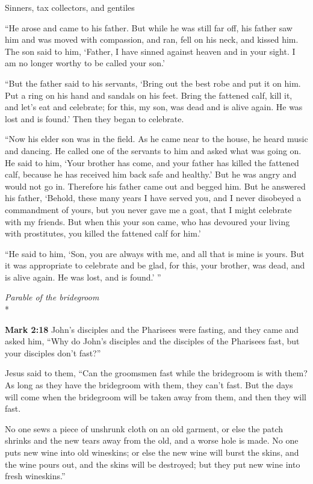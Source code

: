 \documentclass[10pt,twoside]{article} %
\newcommand{\quotesize}{\normalsize{}}
\newenvironment{quotetext}{\begingroup\quotesize}{\endgroup}
\newcommand{\intex}[1]{\index[texts]{#1}}
\newcommand{\bible}[2]{\begin{quotetext}\textbf{#1}\intex{#1} #2\end{quotetext}}
\newcommand{\gospelmark}[2]{\bible{Mark #1}{#2}}
\newcommand{\subhead}[1]{\emph{#1}\\*}
\begin{document}
\begin{section}{Sinners, tax collectors, and gentiles}
{   ``He arose and came to his father. But while he was still far off, his father saw him and was moved with compassion, and ran, fell on his neck, and kissed him.    The son said to him, `Father, I have sinned against heaven and in your sight. I am no longer worthy to be called your son.'

   ``But the father said to his servants, `Bring out the best robe and put it on him. Put a ring on his hand and sandals on his feet.    Bring the fattened calf, kill it, and let's eat and celebrate;    for this, my son, was dead and is alive again. He was lost and is found.' Then they began to celebrate.

   ``Now his elder son was in the field. As he came near to the house, he heard music and dancing.    He called one of the servants to him and asked what was going on.    He said to him, `Your brother has come, and your father has killed the fattened calf, because he has received him back safe and healthy.'    But he was angry and would not go in. Therefore his father came out and begged him.    But he answered his father, `Behold, these many years I have served you, and I never disobeyed a commandment of yours, but you never gave me a goat, that I might celebrate with my friends.    But when this your son came, who has devoured your living with prostitutes, you killed the fattened calf for him.'

   ``He said to him, `Son, you are always with me, and all that is mine is yours.    But it was appropriate to celebrate and be glad, for this, your brother, was dead, and is alive again. He was lost, and is found.' '' 
}

\subhead{Parable of the bridegroom}

\gospelmark{2:18}{John's disciples and the Pharisees were fasting, and they came and asked him, ``Why do John's disciples and the disciples of the Pharisees fast, but your disciples don't fast?''

  Jesus said to them, ``Can the groomsmen fast while the bridegroom is with them? As long as they have the bridegroom with them, they can't fast.    But the days will come when the bridegroom will be taken away from them, and then they will fast.

    No one sews a piece of unshrunk cloth on an old garment, or else the patch shrinks and the new tears away from the old, and a worse hole is made.    No one puts new wine into old wineskins; or else the new wine will burst the skins, and the wine pours out, and the skins will be destroyed; but they put new wine into fresh wineskins.'' }


\end{section}
\end{document}

